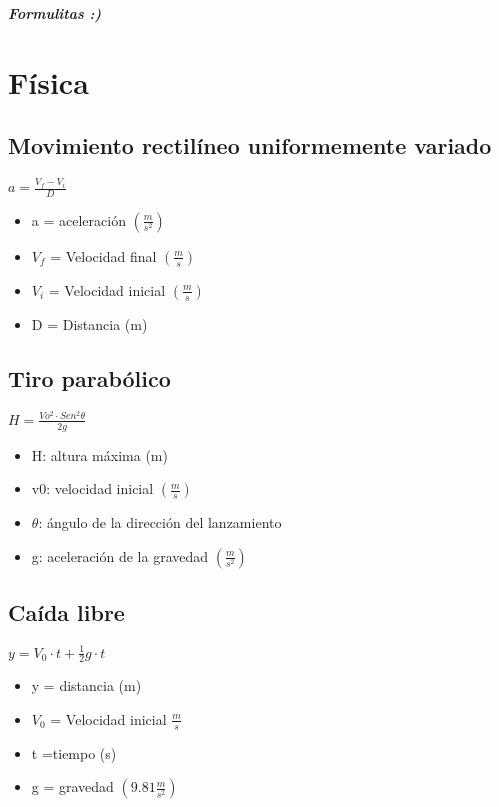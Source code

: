 \documentclass[a4peper, 12pt]{article}
\begin{document}
\begin{center}
\textit{\textbf{\huge{Formulitas :)}}}    
\end{center}
\section{Física}
\subsection{Movimiento rectilíneo uniformemente variado}

$a= \frac {V_{f} - V_{i}}{D}$

\begin{itemize}
    \item a = aceleración $(\frac{m}{s^2})$
    \item $V_{f}$ = Velocidad final $(\frac{m}{s})$
    \item $V_{i}$ = Velocidad inicial $(\frac{m}{s})$
    \item D = Distancia (m)
\end{itemize}
\subsection{Tiro parabólico}

$H=\frac{Vo^2 \cdot Sen^2 \theta}{2g}$
\begin{itemize}

\item H: altura máxima (m)

\item v0: velocidad inicial $(\frac{m}{s})$

\item $\theta$: ángulo de la dirección del lanzamiento

\item g: aceleración de la gravedad $(\frac{m}{s^2})$

\end{itemize}

\subsection{Caída libre}

$y= V_{0} \cdot t + \frac{1}{2} g \cdot t$
\begin{itemize}
    \item  y = distancia (m)
    \item  $V_{0}$ = Velocidad inicial $\frac{m}{s}$
    \item  t =tiempo (s)
    \item  g = gravedad $(9.81 \frac{m}{s^2})$
\end{itemize}
\end{document}
